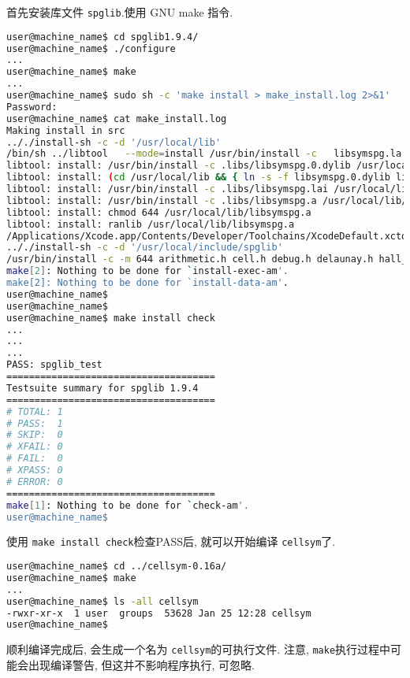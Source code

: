 \documentclass[a4paper, 10pt]{article}
\begin{document}
\begin{description}
首先安装库文件 \verb|spglib|.使用 GNU make 指令. 
\begin{lstlisting}[language={bash}]
user@machine_name$ cd spglib1.9.4/
user@machine_name$ ./configure
...
user@machine_name$ make
...
user@machine_name$ sudo sh -c 'make install > make_install.log 2>&1'
Password:
user@machine_name$ cat make_install.log 
Making install in src
.././install-sh -c -d '/usr/local/lib'
/bin/sh ../libtool   --mode=install /usr/bin/install -c   libsymspg.la '/usr/local/lib'
libtool: install: /usr/bin/install -c .libs/libsymspg.0.dylib /usr/local/lib/libsymspg.0.dylib
libtool: install: (cd /usr/local/lib && { ln -s -f libsymspg.0.dylib libsymspg.dylib || { rm -f libsymspg.dylib && ln -s libsymspg.0.dylib libsymspg.dylib; }; })
libtool: install: /usr/bin/install -c .libs/libsymspg.lai /usr/local/lib/libsymspg.la
libtool: install: /usr/bin/install -c .libs/libsymspg.a /usr/local/lib/libsymspg.a
libtool: install: chmod 644 /usr/local/lib/libsymspg.a
libtool: install: ranlib /usr/local/lib/libsymspg.a
/Applications/Xcode.app/Contents/Developer/Toolchains/XcodeDefault.xctoolchain/usr/bin/ranlib: file: /usr/local/lib/libsymspg.a(debug.o) has no symbols
.././install-sh -c -d '/usr/local/include/spglib'
/usr/bin/install -c -m 644 arithmetic.h cell.h debug.h delaunay.h hall_symbol.h kgrid.h kpoint.h mathfunc.h niggli.h pointgroup.h primitive.h refinement.h site_symmetry.h sitesym_database.h spacegroup.h spg_database.h spglib.h spin.h symmetry.h version.h '/usr/local/include/spglib'
make[2]: Nothing to be done for `install-exec-am'.
make[2]: Nothing to be done for `install-data-am'.
user@machine_name$
user@machine_name$
user@machine_name$ make install check
...
...
...
PASS: spglib_test
=====================================
Testsuite summary for spglib 1.9.4
=====================================
# TOTAL: 1
# PASS:  1
# SKIP:  0
# XFAIL: 0
# FAIL:  0
# XPASS: 0
# ERROR: 0
=====================================
make[1]: Nothing to be done for `check-am'.
user@machine_name$
\end{lstlisting}

使用 \verb|make install check|检查PASS后, 就可以开始编译 \verb|cellsym|了.
\begin{lstlisting}[language={bash}]
user@machine_name$ cd ../cellsym-0.16a/
user@machine_name$ make
...
user@machine_name$ ls -all cellsym
-rwxr-xr-x  1 user  groups  53628 Jan 25 12:28 cellsym
user@machine_name$ 
\end{lstlisting}

顺利编译完成后, 会生成一个名为 \verb|cellsym|的可执行文件.
注意, \verb|make|执行过程中可能会出现编译警告, 但这并不影响程序执行, 可忽略.


\end{description}
\end{document}
